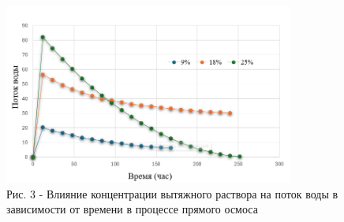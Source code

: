 \begin{figure}[H]
	\centering
	\includegraphics[width=0.85\textwidth]{media/chem/image27}
	\caption*{Рис. 3 - Влияние концентрации вытяжного раствора на поток воды в
зависимости от времени в процессе прямого осмоса}
\end{figure}

